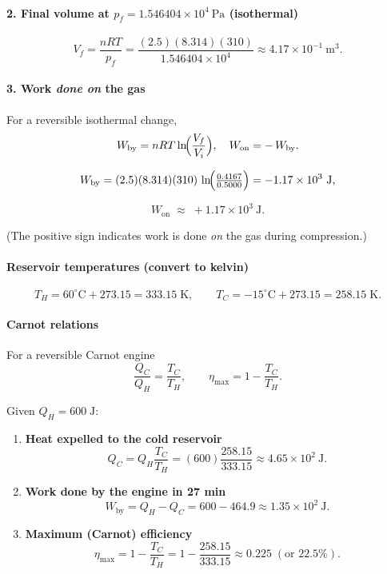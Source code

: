 \documentclass[12pt]{article}
\theoremstyle{definition} %
\theoremstyle{plain} %
\begin{document}
\paragraph{2. Final volume at \(p_f = 1.546404\times10^{4}\ \text{Pa}\) (isothermal)}
\[
  V_f = \frac{nRT}{p_f}
       = \frac{(2.5)(8.314)(310)}
              {1.546404\times10^{4}}
       \approx \boxed{4.17\times10^{-1}\ \text{m}^{3}}.
\]

\paragraph{3. Work \emph{done on} the gas}
For a reversible isothermal change,
\[
  W_{\text{by}} = nRT\ln\!\Bigl(\frac{V_f}{V_i}\Bigr),
  \quad
  W_{\text{on}} = -\,W_{\text{by}}.
\]

\[
  W_{\text{by}}
  = (2.5)(8.314)(310)\,
    \ln\!\Bigl(\tfrac{0.4167}{0.5000}\Bigr)
  = -1.17\times10^{3}\ \text{J},
\]

\[
  \boxed{W_{\text{on}} \;\approx\; +1.17\times10^{3}\ \text{J}}.
\]

(The positive sign indicates work is done \emph{on} the gas during compression.)
\paragraph{Reservoir temperatures (convert to kelvin)}
\[
  T_H = 60^{\circ}\text{C} + 273.15 = 333.15\;\text{K},
  \qquad
  T_C = -15^{\circ}\text{C} + 273.15 = 258.15\;\text{K}.
\]

\paragraph{Carnot relations}
For a reversible Carnot engine
\[
  \frac{Q_C}{Q_H} = \frac{T_C}{T_H},
  \qquad
  \eta_{\max} = 1 - \frac{T_C}{T_H}.
\]

Given \(Q_H = 600\;\text{J}\):

\begin{enumerate}
  \item \textbf{Heat expelled to the cold reservoir}
        \[
          Q_C
          = Q_H \frac{T_C}{T_H}
          = (600)\frac{258.15}{333.15}
          \approx \boxed{4.65\times10^{2}\ \text{J}}.
        \]

  \item \textbf{Work done by the engine in 27 min}
        \[
          W_{\text{by}}
          = Q_H - Q_C
          = 600 - 464.9
          \approx \boxed{1.35\times10^{2}\ \text{J}}.
        \]

  \item \textbf{Maximum (Carnot) efficiency}
        \[
          \eta_{\max}
          = 1 - \frac{T_C}{T_H}
          = 1 - \frac{258.15}{333.15}
          \approx \boxed{0.225}\;(\text{or }22.5\%).
        \]
\end{enumerate}
\end{document}

